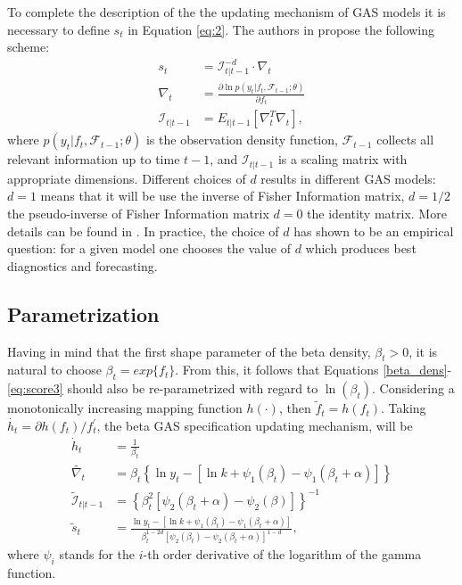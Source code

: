 \documentclass[a4paper]{IEEEtran}
\begin{document}
To complete the description of the the updating mechanism of GAS models it is necessary to define $s_{t}$ in  Equation \eqref{eq:2}. The authors in \cite{creal2013generalized} propose the following scheme:
\begin{align}
s_{t} &= \mathcal{I}_{t|t-1}^{-d} \cdot \nabla_{t}\label{eq:score1}\\
\nabla_{t} &= \frac{\partial \ln p(y_{t}|f_{t},\mathcal{F}_{t-1};\theta)}{\partial f_{t}}\label{eq:score2}\\
\mathcal{I}_{t|t-1} &= E_{t|t-1}[\nabla_{t}^T\nabla_{t}],\label{eq:score3} 
\end{align}
\noindent
where $p(y_{t}|f_{t},\mathcal{F}_{t-1};\theta)$ is the observation density function, $\mathcal{F}_{t-1}$ collects all relevant information up to time $t-1$, and $\mathcal{I}_{t|t-1}$ is a scaling matrix with appropriate dimensions. Different choices of $d$ results in different GAS models: $d=1$ means that it will be use the inverse of Fisher Information matrix, $d=1/2$ the pseudo-inverse of Fisher Information matrix $d=0$ the identity matrix. More details can be found in \cite{creal2013generalized}. In practice, the choice of $d$ has shown to be an empirical question: for a given model one chooses the value of $d$ which produces best diagnostics and forecasting.

\subsection{Parametrization}

Having in mind that the first shape parameter of the beta density, $\beta_{t}>0$, it is natural to choose $\beta_{t}=exp\{f_{t}\}$. From this, it follows that Equations \eqref{beta_dens}-\eqref{eq:score3} should also be re-parametrized with regard to $\ln(\beta_t)$. Considering a monotonically increasing mapping function $h(\cdot)$, then $\tilde{f}_{t}=h(f_{t})$. Taking $\dot{h_{t}} = \partial h(f_{t})/f_{t}^{'}$, the beta GAS specification updating mechanism, will be
\begin{align}
\dot{h}_{t} &= \frac{1}{\beta_{t}}\nonumber\\
\tilde{\nabla_{t}}&=\beta_{t}\left\{\ln y_{t} - [\ln k + \psi_{1}(\beta_{t}) - \psi_{1}(\beta_{t}+\alpha)]\right\}\\ \nonumber
\tilde{\mathcal{I}}_{t|t-1} &= \left\{ \beta_{t}^{2} [ \psi_{2} (\beta_{t} + \alpha) - \psi_{2} (\beta) ] \right\}^{-1}\\
\tilde{s}_{t}&=\frac{\ln y_{t} - [\ln k + \psi_{1}(\beta_{t}) - \psi_{1}(\beta_{t}+\alpha)]}{\beta_{t}^{1-2d}[\psi_{2}(\beta_{t}) - \psi_{2}(\beta_{t} + \alpha)]^{1-d}},\label{betascore1}
\end{align}
\noindent
where $\psi_{i}$ stands for the $i$-th order derivative of the logarithm of the gamma function.
\end{document}
